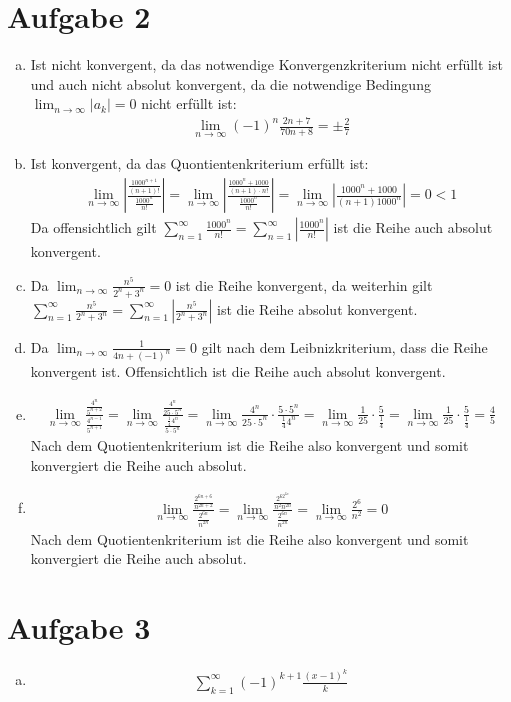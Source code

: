 \documentclass[10pt,a4paper,parskip=half]{scrartcl}
\begin{document}
\section*{Aufgabe 2}
\begin{enumerate}[a)]
	\item 
	Ist nicht konvergent, da das notwendige Konvergenzkriterium nicht erfüllt ist und auch nicht absolut konvergent, da die notwendige Bedingung $\lim_{n\to\infty} |a_k| = 0$ nicht erfüllt ist:
		\begin{align*} 
			\lim_{n \to \infty} (-1)^n\frac{2n+7}{70n + 8} = \pm \frac 27 
		\end{align*}
         \item 
         Ist konvergent, da das Quontientenkriterium erfüllt ist:
            \begin{align*} 
               \lim_{n \to \infty} \left|\frac{\frac{1000^{n+1}}{(n+1)!}}{\frac{1000^n}{n!}}\right| = \lim_{n \to \infty} \left|\frac{\frac{1000^{n} + 1000}{(n+1) \cdot n!}}{\frac{1000^n}{n!}}\right| = \lim_{n \to \infty} \left|\frac{1000^{n} + 1000}{(n+1) 1000^n}\right| = 0 < 1
            \end{align*}
         Da offensichtlich gilt $\sum_{n=1}^{\infty}\frac{1000^n}{n!} =  \sum_{n=1}^{\infty}\left|\frac{1000^n}{n!}\right|$  ist die Reihe auch absolut konvergent.
         \item 
         Da $\lim_{n \to \infty} \frac{n^5}{2^n+3^n} = 0$ ist die Reihe konvergent, da weiterhin gilt $\sum_{n=1}^{\infty}\frac{n^5}{2^n+3^n}  =  \sum_{n=1}^{\infty}\left|\frac{n^5}{2^n+3^n}\right|$ ist die Reihe absolut konvergent.
         \item 
         Da $\lim_{n \to \infty} \frac{1}{4n + (-1)^n} = 0$ gilt nach dem Leibnizkriterium, dass die Reihe konvergent ist. Offensichtlich ist die Reihe auch absolut konvergent.
\item
\begin{align*}
\lim_{n\to\infty} \frac{\frac{4^{n}}{5^{n+2}}}{\frac{4^{n-1}}{5^{n+1}}} = \lim_{n\to\infty} \frac{\frac{4^{n}}{25\cdot5^{n}}}{\frac{\frac 1 4 4^{n}}{5\cdot5^{n}}} = \lim_{n\to\infty}\frac{4^{n}}{25\cdot5^{n}} \cdot \frac{5\cdot5^{n}}{\frac 1 4 4^{n}} = \lim_{n\to\infty}\frac{1}{25} \cdot \frac{5}{\frac 1 4} = \lim_{n\to\infty}\frac{1}{25} \cdot \frac{5}{\frac 1 4} = \frac 4 5
\end{align*}
Nach dem Quotientenkriterium ist die Reihe also konvergent und somit konvergiert die Reihe auch absolut.
\item
\begin{align*}
\lim_{n\to\infty} \frac{\frac{2^{6n+6}}{n^{2n+2}}}{\frac{2^{6n}}{n^{2n}}} = \lim_{n\to\infty} \frac{\frac{2^62^{6n}}{n^2n^{2n}}}{\frac{2^{6n}}{n^{2n}}} = \lim_{n\to\infty} \frac{2^6}{n^2} = 0 
\end{align*}
Nach dem Quotientenkriterium ist die Reihe also konvergent und somit konvergiert die Reihe auch absolut.
\end{enumerate}
\section*{Aufgabe 3}
\begin{enumerate}[a)]
\item 
\begin{align*}
\sum_{k=1}^{\infty}(-1)^{k+1}\frac{(x-1)^k}{k}
\end{align*}
\end{enumerate}
\end{document}
